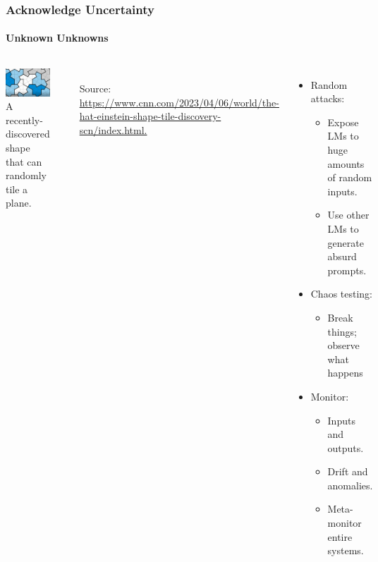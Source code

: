 \documentclass[11pt,
               aspectratio=169,
               hyperref={colorlinks}
               ]{beamer}
\begin{document}
		\begin{frame}
			
			\frametitle{Acknowledge Uncertainty}
			\framesubtitle{Unknown Unknowns}
			
			\begin{columns}
				\centering
				\newline
				\includegraphics[width=\textwidth]{../img/uncertainty.jpg} 
				\newline
				\tiny{A recently-discovered shape that can randomly tile a plane.}
				
				\par\noindent\rule{100pt}{0.4pt}\\
				\vspace{5pt}
				\scriptsize{\tiny{Source: \url{https://www.cnn.com/2023/04/06/world/the-hat-einstein-shape-tile-discovery-scn/index.html.}}}

				\begin{itemize}
					\item Random attacks:
						\begin{itemize}
							\item Expose LMs to huge amounts of random inputs.
							\item Use other LMs to generate absurd prompts.
						\end{itemize}
					\item Chaos testing:
						\begin{itemize}
							\item Break things; observe what happens
						\end{itemize}
					\item Monitor:
						\begin{itemize}
							\item Inputs and outputs.
							\item Drift and anomalies.
							\item Meta-monitor entire systems.
						\end{itemize}
				\end{itemize}
			\end{columns}
					
		\end{frame}
\end{document}
